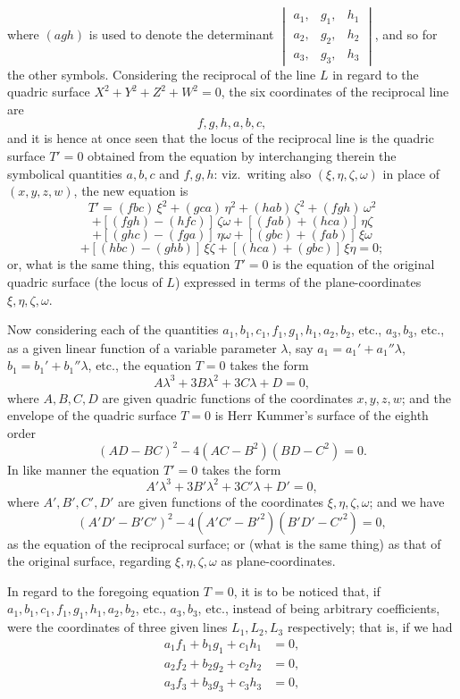 \documentclass[11pt,a4paper]{article}
\begin{document}
\noindent where $(agh)$ is used to denote the determinant $\begin{vmatrix} a_{1}, & g_{1}, & h_{1}\\ a_{2}, & g_{2}, & h_{2}\\ a_{3}, & g_{3}, & h_{3}\end{vmatrix}$, and so for the other symbols. Considering the reciprocal of the line $L$ in regard to the quadric surface $X^{2} + Y^{2} + Z^{2} + W^{2} = 0$, the six coordinates of the reciprocal line are
\[
f, g, h, a, b, c,
\]
and it is hence at once seen that the locus of the reciprocal line is the quadric surface $T' = 0$ obtained from the equation by interchanging therein the symbolical quantities $a, b, c$ and $f, g, h$: viz.\ writing also $(\xi, \eta, \zeta, \omega)$ in place of $(x, y, z, w)$, the new equation is
\[
T' = (fbc)\,\xi^{2} + (gca)\,\eta^{2} + (hab)\,\zeta^{2} + (fgh)\,\omega^{2}
\]
\[
+ [(fgh) - (hfc)]\,\zeta\omega + [(fab) + (hca)]\,\eta\zeta
\]
\[
+ [(ghc) - (fga)]\,\eta\omega + [(gbc) + (fab)]\,\xi\omega
\]
\[
+ [(hbc) - (ghb)]\,\xi\zeta + [(hca) + (gbc)]\,\xi\eta = 0;
\]
or, what is the same thing, this equation $T' = 0$ is the equation of the original quadric surface (the locus of $L$) expressed in terms of the plane-coordinates $\xi, \eta, \zeta, \omega$.

\medskip

Now considering each of the quantities $a_{1}, b_{1}, c_{1}, f_{1}, g_{1}, h_{1}, a_{2}, b_{2}$, etc., $a_{3}, b_{3}$, etc., as a given linear function of a variable parameter $\lambda$, say $a_{1} = a_{1}' + a_{1}''\lambda$, $b_{1} = b_{1}' + b_{1}''\lambda$, etc., the equation $T = 0$ takes the form
\[
A\lambda^{3} + 3B\lambda^{2} + 3C\lambda + D = 0,
\]
where $A, B, C, D$ are given quadric functions of the coordinates $x, y, z, w$; and the envelope of the quadric surface $T = 0$ is Herr Kummer's surface of the eighth order
\[
(AD - BC)^{2} - 4(AC - B^{2})(BD - C^{2}) = 0.
\]
In like manner the equation $T' = 0$ takes the form
\[
A'\lambda^{3} + 3B'\lambda^{2} + 3C'\lambda + D' = 0,
\]
where $A', B', C', D'$ are given functions of the coordinates $\xi, \eta, \zeta, \omega$; and we have
\[
(A'D' - B'C')^{2} - 4(A'C' - B'^{2})(B'D' - C'^{2}) = 0,
\]
as the equation of the reciprocal surface; or (what is the same thing) as that of the original surface, regarding $\xi, \eta, \zeta, \omega$ as plane-coordinates.

\medskip

In regard to the foregoing equation $T = 0$, it is to be noticed that, if $a_{1}, b_{1}, c_{1}, f_{1}, g_{1}, h_{1}, a_{2}, b_{2}$, etc., $a_{3}, b_{3}$, etc., instead of being arbitrary coefficients, were the coordinates of three given lines $L_{1}, L_{2}, L_{3}$ respectively; that is, if we had
\begin{align*}
a_{1}f_{1} + b_{1}g_{1} + c_{1}h_{1} &= 0,\\
a_{2}f_{2} + b_{2}g_{2} + c_{2}h_{2} &= 0,\\
a_{3}f_{3} + b_{3}g_{3} + c_{3}h_{3} &= 0,
\end{align*}
\end{document}
